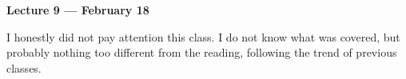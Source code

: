 \vspace{3mm}
\noindent \textbf{Lecture 9 --- February 18\th}

I honestly did not pay attention this class.
I do not know what was covered, but probably nothing too different from the reading, following the trend of previous classes.